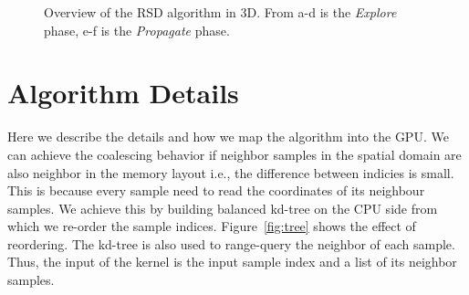 \documentclass[12pt] {article}
\begin{document}
\begin{figure}[!tbh]
\centering        
   \caption{Overview of the RSD algorithm in 3D. From a-d is the \emph{Explore} phase, e-f is the \emph{Propagate} phase.}
   \label{fig:algo}
\end{figure}

\section*{Algorithm Details}
Here we describe the details and how we map the algorithm into the GPU. 
We can achieve the coalescing behavior if neighbor samples in the spatial domain are also neighbor in the memory layout i.e., the difference between indicies is small. This is because every sample need to read the coordinates of its neighbour samples. We achieve this by building balanced kd-tree on the CPU side from which we re-order the sample indices. Figure~\ref{fig:tree} shows the effect of reordering. The kd-tree is also used to range-query the neighbor of each sample. Thus, the input of the kernel is the input sample index and a list of its neighbor samples. 
\end{document}
